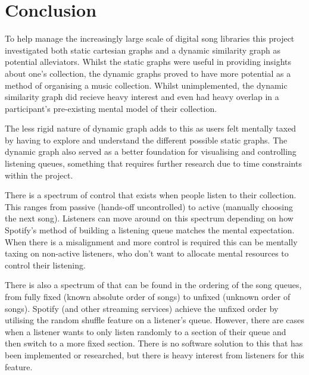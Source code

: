 \chapter{Conclusion}
To help manage the increasingly large scale of digital song libraries this project investigated both static cartesian graphs and a dynamic similarity graph as potential alleviators. Whilst the static graphs were useful in providing insights about one's collection, the dynamic graphs proved to have more potential as a method of organising a music collection. Whilst unimplemented, the dynamic similarity graph did recieve heavy interest and even had heavy overlap in a participant's pre-existing mental model of their collection.

The less rigid nature of dynamic graph adds to this as users felt mentally taxed by having to explore and understand the different possible static graphs. The dynamic graph also served as a better foundation for visualising and controlling listening queues, something that requires further research due to time constraints within the project.

There is a spectrum of control that exists when people listen to their collection. This ranges from passive (hands-off uncontrolled) to active (manually choosing the next song). Listeners can move around on this spectrum depending on how Spotify's method of building a listening queue matches the mental expectation. When there is a misalignment and more control is required this can be mentally taxing on non-active listeners, who don't want to allocate mental resources to control their listening.

There is also a spectrum of that can be found in the ordering of the song queues, from fully fixed (known absolute order of songs) to unfixed (unknown order of songs). Spotify (and other streaming services) achieve the unfixed order by utilising the random shuffle feature on a listener's queue. However, there are cases when a listener wants to only listen randomly to a section of their queue and then switch to a more fixed section. There is no software solution to this that has been implemented or researched, but there is heavy interest from listeners for this feature.


